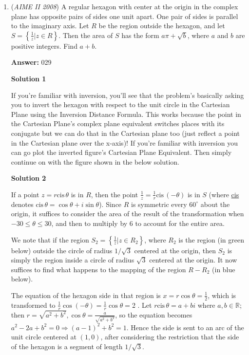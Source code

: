 \begin{enumerate}
 


	\item (\textit{AIME II 2008}) A regular hexagon with center at the origin in the complex plane has opposite pairs of sides one unit apart. One pair of sides is parallel to the imaginary axis. Let $R$ be the region outside the hexagon, and let $S = \left\lbrace\frac{1}{z}|z \in R\right\rbrace$. Then the area of $S$ has the form $a\pi + \sqrt{b}$, where $a$ and $b$ are positive integers. Find $a + b$.


 
 \textbf{Answer: }029



\textbf{Solution 1}

If you're familiar with inversion, you'll see that the problem's basically asking you to invert the hexagon with respect to the unit circle in the Cartesian Plane using the Inversion Distance Formula. This works because the point in the Cartesian Plane's complex plane equivalent switches places with its conjugate but we can do that in the Cartesian plane too (just reflect a point in the Cartesian plane over the x-axis)! If you're familiar with inversion you can go plot the inverted figure's Cartesian Plane Equivalent. Then simply continue on with the figure shown in the below solution.

 



\textbf{Solution 2}

If a point $z = r\text{cis}\,\theta$ is in $R$, then the point $\frac{1}{z} = \frac{1}{r} \text{cis}\, \left(-\theta\right)$ is in $S$ (where \href{https://artofproblemsolving.com/wiki/index.php?title=Cis}{cis} denotes $\text{cis}\, \theta = \cos \theta + i \sin \theta$). Since $R$ is symmetric every $60^{\circ}$ about the origin, it suffices to consider the area of the result of the transformation when $-30 \le \theta \le 30$, and then to multiply by $6$ to account for the entire area.

 We note that if the region $S_2 = \left\lbrace\frac{1}{z}|z \in R_2\right\rbrace$, where $R_2$ is the region (in green below) outside the circle of radius $1/\sqrt{3}$ centered at the origin, then $S_2$ is simply the region inside a circle of radius $\sqrt{3}$ centered at the origin. It now suffices to find what happens to the mapping of the region $R-R_2$ (in blue below). 

 The equation of the hexagon side in that region is $x = r \cos \theta = \frac{1}{2}$, which is transformed to $\frac{1}{r} \cos (-\theta) = \frac{1}{r} \cos \theta =$2 . Let $r\text{cis}\,\theta = a+bi$ where $a,b \in \mathbb{R}$; then $r = \sqrt{a^2 + b^2}, \cos \theta = \frac{a}{\sqrt{a^2 + b^2}}$, so the equation becomes $a^2 - 2a + b^2 = 0 \Longrightarrow (a-1)^2 + b^2 = 1$. Hence the side is sent to an arc of the unit circle centered at $(1,0)$, after considering the restriction that the side of the hexagon is a segment of length $1/\sqrt{3}$. 


\end{enumerate}
